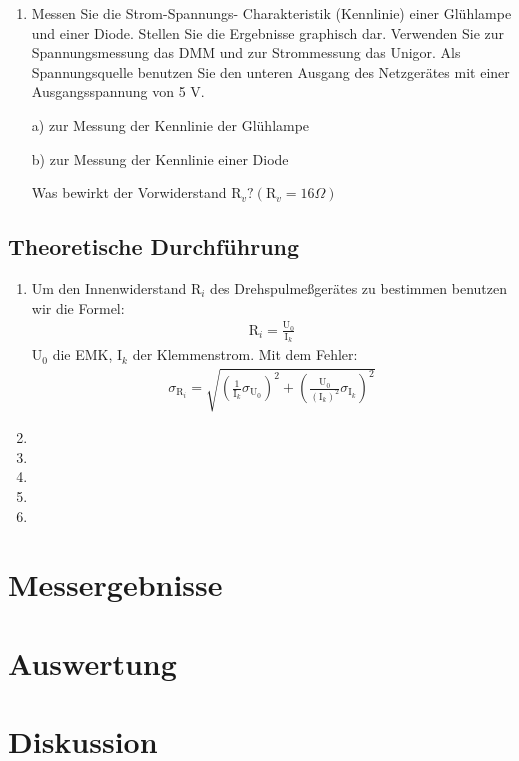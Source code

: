 \documentclass[12pt]{scrartcl}
\begin{document}
\begin{enumerate}
	
	\item
	Messen Sie die Strom-Spannungs-					Charakteristik (Kennlinie) einer 				Glühlampe und einer Diode. Stellen Sie 			die Ergebnisse graphisch dar. Verwenden 			Sie zur Spannungsmessung das DMM und zur 	Strommessung das Unigor. Als 					Spannungsquelle benutzen Sie den unteren 	Ausgang des Netzgerätes mit einer 				Ausgangsspannung von 5 V.
	
	a) zur Messung der Kennlinie der 				Glühlampe
	
	
	b) zur Messung der Kennlinie einer Diode
	
	
	Was bewirkt der Vorwiderstand
	$\text{R}_v? (\text{R}_v= 16\Omega)$
\end{enumerate}


\subsection{Theoretische Durchführung}

\begin{enumerate}

	\item
	Um den Innenwiderstand R$_i$ des 				Drehspulmeßgerätes zu bestimmen benutzen 	wir die Formel:
	\begin{align}
	\text{R}_{i}= \frac{\text{U}_0}					{\text{I}_k}
	\end{align}
	U$_0$ die EMK, I$_k$ der Klemmenstrom.
	Mit dem Fehler:
	\begin{align}
	\sigma_{\text{R}_i} = 							\sqrt{\left(\frac{1}{\text{I}_k}\sigma_{\text{U}_0}\right)^2
	+\left(\frac{\text{U}_0}{(\text{I}_k)^2}\sigma_{\text{I}_k}\right)^2}
	\end{align}	 
	\item
	\item
	\item
	\item
	\item
	
\end{enumerate}


\section{Messergebnisse}



\section{Auswertung}


\section{Diskussion}


\end{document}
